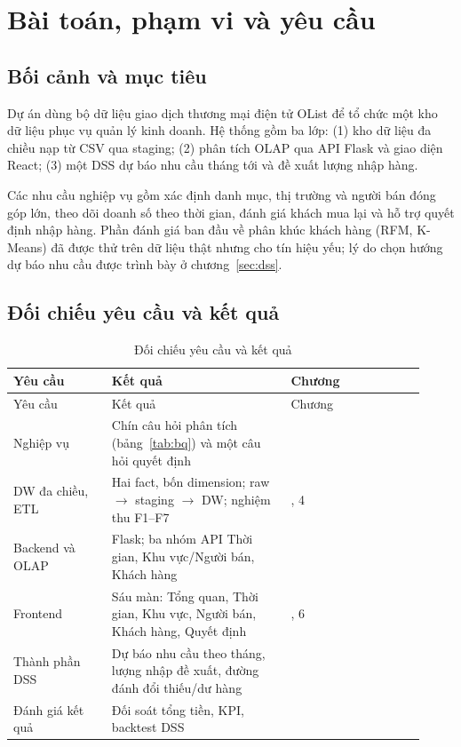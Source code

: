\section{Bài toán, phạm vi và yêu cầu}
\subsection{Bối cảnh và mục tiêu}
Dự án dùng bộ dữ liệu giao dịch thương mại điện tử OList để tổ chức một kho dữ liệu phục vụ quản lý kinh doanh. Hệ thống gồm ba lớp: (1) kho dữ liệu đa chiều nạp từ CSV qua staging; (2) phân tích OLAP qua API Flask và giao diện React; (3) một DSS dự báo nhu cầu tháng tới và đề xuất lượng nhập hàng.

Các nhu cầu nghiệp vụ gồm xác định danh mục, thị trường và người bán đóng góp lớn, theo dõi doanh số theo thời gian, đánh giá khách mua lại và hỗ trợ quyết định nhập hàng. Phần đánh giá ban đầu về phân khúc khách hàng (RFM, K-Means) đã được thử trên dữ liệu thật nhưng cho tín hiệu yếu; lý do chọn hướng dự báo nhu cầu được trình bày ở chương~\ref{sec:dss}.

\subsection{Đối chiếu yêu cầu và kết quả}
\begingroup\small\renewcommand{\arraystretch}{1.18}
\begin{longtable}{>{\raggedright\arraybackslash}p{0.22\linewidth}>{\raggedright\arraybackslash}p{0.40\linewidth}>{\raggedright\arraybackslash}p{0.30\linewidth}}
\caption{Đối chiếu yêu cầu và kết quả}\label{tab:requirements}\\
\toprule Yêu cầu & Kết quả & Chương\\\midrule\endfirsthead
\toprule Yêu cầu & Kết quả & Chương\\\midrule\endhead
\bottomrule\endfoot
Nghiệp vụ & Chín câu hỏi phân tích (bảng~\ref{tab:bq}) và một câu hỏi quyết định & 1\\
DW đa chiều, ETL & Hai fact, bốn dimension; raw $\rightarrow$ staging $\rightarrow$ DW; nghiệm thu F1--F7 & 3, 4\\
Backend và OLAP & Flask; ba nhóm API Thời gian, Khu vực/Người bán, Khách hàng & 5\\
Frontend & Sáu màn: Tổng quan, Thời gian, Khu vực, Người bán, Khách hàng, Quyết định & 5, 6\\
Thành phần DSS & Dự báo nhu cầu theo tháng, lượng nhập đề xuất, đường đánh đổi thiếu/dư hàng & 6\\
Đánh giá kết quả & Đối soát tổng tiền, KPI, backtest DSS & 7\\
\bottomrule
\end{longtable}\endgroup

